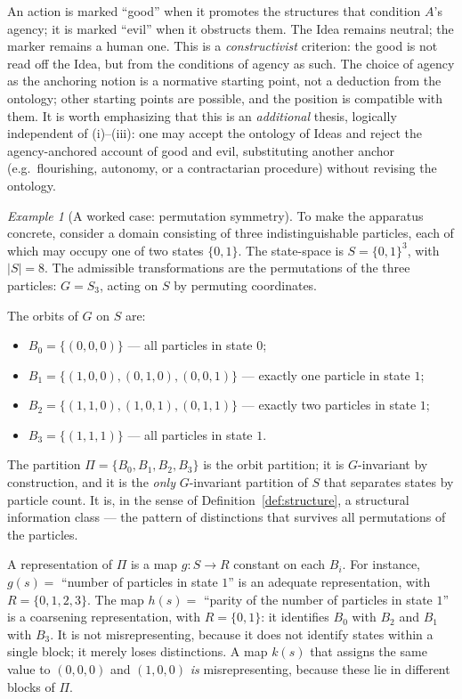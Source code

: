 \documentclass[11pt,a4paper]{article}
\theoremstyle{definition}
\theoremstyle{remark}
\newtheorem{example}{Example}[section]
\begin{document}
An action is marked ``good'' when it promotes the structures that
condition $A$'s agency; it is marked ``evil'' when it obstructs them.
The Idea remains neutral; the marker remains a human one. This is a
\emph{constructivist} criterion: the good is not read off the Idea,
but from the conditions of agency as such. The choice of agency as the
anchoring notion is a normative starting point, not a deduction from
the ontology; other starting points are possible, and the position is
compatible with them. It is worth emphasizing that this is an
\emph{additional} thesis, logically independent of (i)--(iii): one may
accept the ontology of Ideas and reject the agency-anchored account of
good and evil, substituting another anchor (e.g.\ flourishing,
autonomy, or a contractarian procedure) without revising the ontology.

\begin{example}[A worked case: permutation symmetry]\label{sec:example}
To make the apparatus concrete, consider a domain consisting of three
indistinguishable particles, each of which may occupy one of two
states $\{0, 1\}$. The state-space is $S = \{0,1\}^3$, with $|S| = 8$.
The admissible transformations are the permutations of the three
particles: $G = S_3$, acting on $S$ by permuting coordinates.

The orbits of $G$ on $S$ are:
\begin{itemize}[nosep]
  \item $B_0 = \{(0,0,0)\}$ --- all particles in state $0$;
  \item $B_1 = \{(1,0,0), (0,1,0), (0,0,1)\}$ --- exactly one particle
        in state $1$;
  \item $B_2 = \{(1,1,0), (1,0,1), (0,1,1)\}$ --- exactly two
        particles in state $1$;
  \item $B_3 = \{(1,1,1)\}$ --- all particles in state $1$.
\end{itemize}
The partition $\Pi = \{B_0, B_1, B_2, B_3\}$ is the orbit partition;
it is $G$-invariant by construction, and it is the \emph{only}
$G$-invariant partition of $S$ that separates states by particle
count. It is, in the sense of Definition~\ref{def:structure}, a
structural information class --- the pattern of distinctions that
survives all permutations of the particles.

A representation of $\Pi$ is a map $g : S \to R$ constant on each
$B_i$. For instance, $g(s) = $ ``number of particles in state $1$''
is an adequate representation, with $R = \{0,1,2,3\}$. The map
$h(s) = $ ``parity of the number of particles in state $1$'' is a
coarsening representation, with $R = \{0,1\}$: it identifies $B_0$
with $B_2$ and $B_1$ with $B_3$. It is not misrepresenting, because
it does not identify states within a single block; it merely loses
distinctions. A map $k(s)$ that assigns the same value to $(0,0,0)$
and $(1,0,0)$ \emph{is} misrepresenting, because these lie in
different blocks of $\Pi$.


\end{example}
\end{document}
